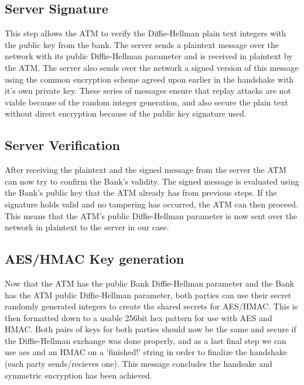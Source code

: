 	\subsection{Server Signature}\label{sec:servsig}
		This step allows the ATM to verify the Diffie-Hellman plain text integers with the public key from the bank. The server sends a plaintext message over the network with its public Diffie-Hellman parameter and is received in plaintext by the ATM. The server also sends over the network a signed version of this message using the common encryption scheme agreed upon earlier in the handshake with it's own private key. These series of messages ensure that replay attacks are not viable because of the random integer generation, and also secure the plain text without direct encryption because of the public key signature used.
		
	\subsection{Server Verification}\label{sec:servconf}
		After receiving the plaintext and the signed message from the server the ATM can now try to confirm the Bank's validity. The signed message is evaluated using the Bank's public key that the ATM already has from previous steps. If the signature holds valid and no tampering has occurred, the ATM can then proceed. This means that the ATM's public Diffie-Hellman parameter is now sent over the network in plaintext to the server in our case.
	
	\subsection{AES/HMAC Key generation}\label{sec:keygen}
		Now that the ATM has the public Bank Diffie-Hellman parameter and the Bank has the ATM public Diffie-Hellman parameter, both parties can use their secret randomly generated integers to create the shared secrets for AES/HMAC. This is then formatted down to a usable 256bit hex pattern for use with AES and HMAC. Both pairs of keys for both  parties should now be the same and secure if the Diffie-Hellman exchange was done properly, and as a last final step we can use aes and an HMAC on a 'finished!' string in order to finalize the handshake (each party sends/recieves one). This message concludes the handsake and symmetric encryption has been achieved.
